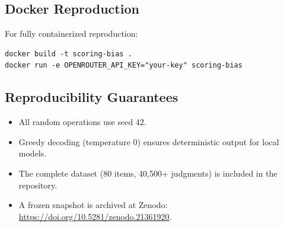 \subsection{Docker Reproduction}

For fully containerized reproduction:
\begin{verbatim}
docker build -t scoring-bias .
docker run -e OPENROUTER_API_KEY="your-key" scoring-bias
\end{verbatim}

\subsection{Reproducibility Guarantees}

\begin{itemize}
    \item All random operations use seed 42.
    \item Greedy decoding (temperature 0) ensures deterministic output for local models.
    \item The complete dataset (80 items, 40,500+ judgments) is included in the repository.
    \item A frozen snapshot is archived at Zenodo: \url{https://doi.org/10.5281/zenodo.21361920}.
\end{itemize}
